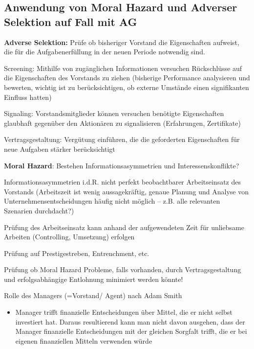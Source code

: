 \documentclass[
]{article}
\providecommand{\tightlist}{%
  \setlength{\itemsep}{0pt}\setlength{\parskip}{0pt}}
\begin{document}
\hypertarget{anwendung-von-moral-hazard-und-adverser-selektion-auf-fall-mit-ag}{%
\subsection{Anwendung von Moral Hazard und Adverser Selektion auf Fall
mit
AG}\label{anwendung-von-moral-hazard-und-adverser-selektion-auf-fall-mit-ag}}

\textbf{Adverse Selektion:} Prüfe ob bisheriger Vorstand die
Eigenschaften aufweist, die für die Aufgabenerfüllung in der neuen
Periode notwendig sind.

Screening: Mithilfe von zugänglichen Informationen versuchen
Rückschlüsse auf die Eigenschaften des Vorstands zu ziehen (bisherige
Performance analysieren und bewerten, wichtig ist zu berücksichtigen, ob
externe Umstände einen signifikanten Einfluss hatten)

Signaling: Vorstandsmitglieder können versuchen benötigte Eigenschaften
glaubhaft gegenüber den Aktionären zu signalisieren (Erfahrungen,
Zertifikate)

Vertragsgestaltung: Vergütung einführen, die die geforderten
Eigenschaften für neue Aufgaben stärker berücksichtigt

\textbf{Moral Hazard}: Bestehen Informationsasymmetrien und
Interessenskonflikte?

Informationsasymmetrien i.d.R. nicht perfekt beobachtbarer
Arbeitseinsatz des Vorstands (Arbeitszeit ist wenig aussagekräftig,
genaue Planung und Analyse von Unternehmensentscheidungen häufig nicht
möglich -- z.B. alle relevanten Szenarien durchdacht?)

Prüfung des Arbeitseinsatz kann anhand der aufgewendeten Zeit für
unliebsame Arbeiten (Controlling, Umsetzung) erfolgen

Prüfung auf Prestigestreben, Entrenchment, etc.

Prüfung ob Moral Hazard Probleme, falls vorhanden, durch
Vertragsgestaltung und erfolgsabhängige Entlohnung minimiert werden
könnte!

Rolle des Managers (=Vorstand/ Agent) nach Adam Smith

\begin{itemize}
\tightlist
\item
  Manager trifft finanzielle Entscheidungen über Mittel, die er nicht
  selbst investiert hat. Daraus resultierend kann man nicht davon
  ausgehen, dass der Manager finanzielle Entscheidungen mit der gleichen
  Sorgfalt trifft, die er bei eigenen finanziellen Mitteln verwenden
  würde
\end{itemize}
\end{document}
